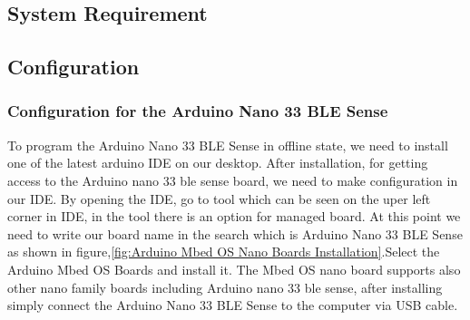\subsection{System Requirement}

\subsection{Configuration}
\subsubsection{Configuration for the Arduino Nano 33 BLE Sense}
To program the Arduino Nano 33 BLE Sense in offline state, we need to install one
of the latest arduino IDE on our desktop. After installation, for getting access to
the Arduino nano 33 ble sense board, we need to make configuration in our IDE. By
opening the IDE, go to tool which can be seen on the uper left corner in IDE, in the
tool there is an option for managed board. At this point we need to write our board
name in the search which is Arduino Nano 33 BLE Sense as shown in figure,\ref{fig:Arduino Mbed OS Nano Boards Installation}.Select
the Arduino Mbed OS Boards and install it. The Mbed OS nano board supports also
other nano family boards including Arduino nano 33 ble sense, after installing simply
connect the Arduino Nano 33 BLE Sense to the computer via USB cable.


